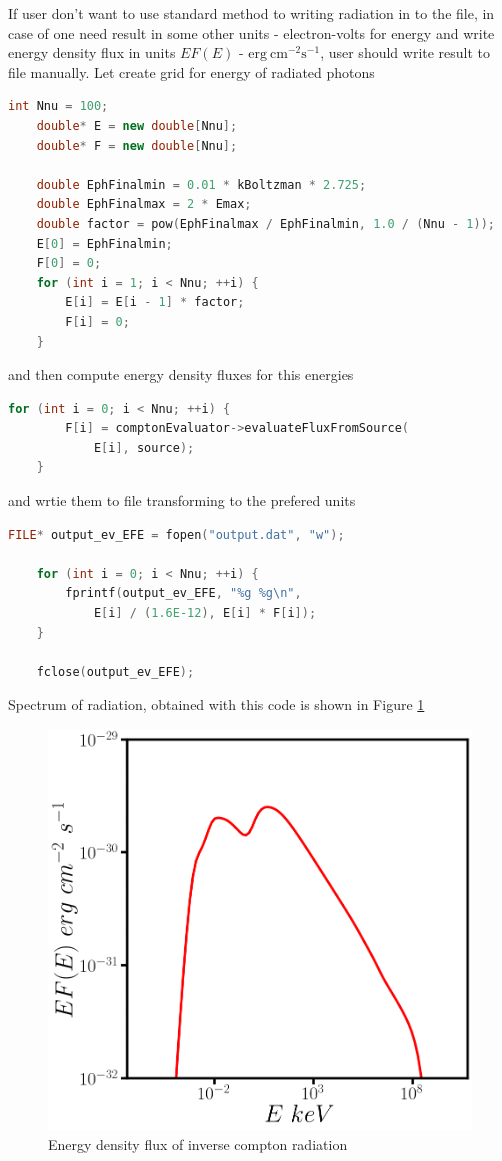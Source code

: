 If user don't want to use standard method to writing radiation in to the file, in case of one need result in some other units - electron-volts for energy and write energy density flux in units 
$E F(E)$ - $\text{erg}~\text{cm}^{-2}\text{s}^{-1}$, user should write result to file manually. Let create grid for energy of radiated photons
\begin{lstlisting}[language=c++]
    int Nnu = 100;
    double* E = new double[Nnu];
    double* F = new double[Nnu];

    double EphFinalmin = 0.01 * kBoltzman * 2.725;
    double EphFinalmax = 2 * Emax;
    double factor = pow(EphFinalmax / EphFinalmin, 1.0 / (Nnu - 1));
    E[0] = EphFinalmin;
    F[0] = 0;
    for (int i = 1; i < Nnu; ++i) {
        E[i] = E[i - 1] * factor;
        F[i] = 0;
    }
\end{lstlisting}
and then compute energy density fluxes for this energies
\begin{lstlisting}[language=c++]
	for (int i = 0; i < Nnu; ++i) {
		F[i] = comptonEvaluator->evaluateFluxFromSource(
		    E[i], source);
	}
\end{lstlisting}
and wrtie them to file transforming to the prefered units
\begin{lstlisting}[language=c++]
	FILE* output_ev_EFE = fopen("output.dat", "w");
	
	for (int i = 0; i < Nnu; ++i) {
		fprintf(output_ev_EFE, "%g %g\n",
		    E[i] / (1.6E-12), E[i] * F[i]);
	}

	fclose(output_ev_EFE);
\end{lstlisting}
Spectrum of radiation, obtained with this code is shown in Figure \ref{compton}
\begin{figure}[h]
	\centering
	\includegraphics[width=12.5 cm]{./fig_en/compton.png} 
	\caption{Energy density flux of inverse compton radiation}
	\label{compton}
\end{figure}

